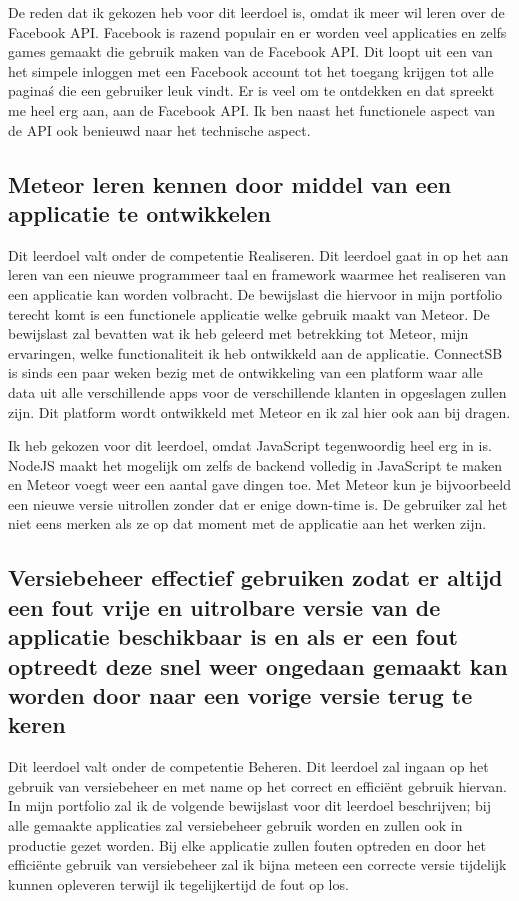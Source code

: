 \documentclass{article}
\begin{document}
De reden dat ik gekozen heb voor dit leerdoel is, omdat ik meer wil leren over de Facebook API. Facebook is razend populair en er worden veel applicaties en zelfs games gemaakt die gebruik maken van de Facebook API. Dit loopt uit een van het simpele inloggen met een Facebook account tot het toegang krijgen tot alle pagina\'s die een gebruiker leuk vindt. Er is veel om te ontdekken en dat spreekt me heel erg aan, aan de Facebook API. Ik ben naast het functionele aspect van de API ook benieuwd naar het technische aspect.

\subsection{Meteor leren kennen door middel van een applicatie te ontwikkelen}
Dit leerdoel valt onder de competentie Realiseren. Dit leerdoel gaat in op het aan leren van een nieuwe programmeer taal en framework waarmee het realiseren van een applicatie kan worden volbracht. De bewijslast die hiervoor in mijn portfolio terecht komt is een functionele applicatie welke gebruik maakt van Meteor. De bewijslast zal bevatten wat ik heb geleerd met betrekking tot Meteor, mijn ervaringen, welke functionaliteit ik heb ontwikkeld aan de applicatie. ConnectSB is sinds een paar weken bezig met de ontwikkeling van een platform waar alle data uit alle verschillende apps voor de verschillende klanten in opgeslagen zullen zijn. Dit platform wordt ontwikkeld met Meteor en ik zal hier ook aan bij dragen.

Ik heb gekozen voor dit leerdoel, omdat JavaScript tegenwoordig heel erg in is. NodeJS maakt het mogelijk om zelfs de backend volledig in JavaScript te maken en Meteor voegt weer een aantal gave dingen toe. Met Meteor kun je bijvoorbeeld een nieuwe versie uitrollen zonder dat er enige down-time is. De gebruiker zal het niet eens merken als ze op dat moment met de applicatie aan het werken zijn. 

\subsection{Versiebeheer effectief gebruiken zodat er altijd een fout vrije en uitrolbare versie van de applicatie beschikbaar is en als er een fout optreedt deze snel weer ongedaan gemaakt kan worden door naar een vorige versie terug te keren}
Dit leerdoel valt onder de competentie Beheren. Dit leerdoel zal ingaan op het gebruik van versiebeheer en met name op het correct en efficiënt gebruik hiervan. In mijn portfolio zal ik de volgende bewijslast voor dit leerdoel beschrijven; bij alle gemaakte applicaties zal versiebeheer gebruik worden en zullen ook in productie gezet worden. Bij elke applicatie zullen fouten optreden en door het efficiënte gebruik van versiebeheer zal ik bijna meteen een correcte versie tijdelijk kunnen opleveren terwijl ik tegelijkertijd de fout op los.
\end{document}
